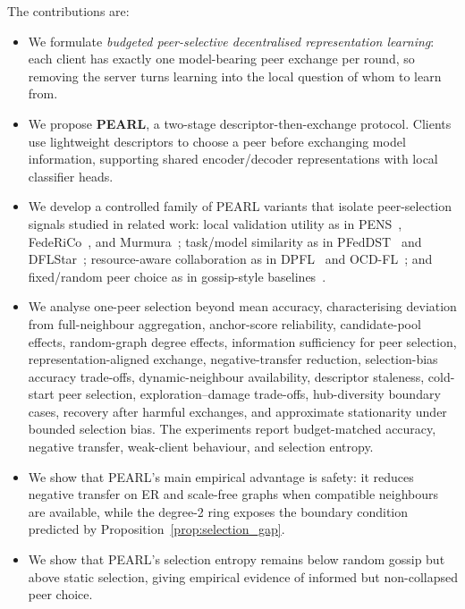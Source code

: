 \documentclass[conference]{IEEEtran}
\begin{document}
The contributions are:
\begin{itemize}
    \item We formulate \emph{budgeted peer-selective decentralised representation learning}: each client has exactly one model-bearing peer exchange per round, so removing the server turns learning into the local question of whom to learn from.

    \item We propose \textbf{PEARL}, a two-stage descriptor-then-exchange protocol. Clients use lightweight descriptors to choose a peer before exchanging model information, supporting shared encoder/decoder representations with local classifier heads.

    \item We develop a controlled family of PEARL variants that isolate peer-selection signals studied in related work: local validation utility as in PENS~\cite{onoszko2021pens}, FedeRiCo~\cite{sui2022federico}, and Murmura~\cite{rangwala2025murmura}; task/model similarity as in PFedDST~\cite{fan2025pfeddst} and DFLStar~\cite{soltani2024dflstar}; resource-aware collaboration as in DPFL~\cite{kharrat2024dpfl} and OCD-FL~\cite{masmoudi2024ocdfl}; and fixed/random peer choice as in gossip-style baselines~\cite{ormandi2013gossip,hegedus2019gossip,koloskova2019choco}.

    \item We analyse one-peer selection beyond mean accuracy, characterising deviation from full-neighbour aggregation, anchor-score reliability, candidate-pool effects, random-graph degree effects, information sufficiency for peer selection, representation-aligned exchange, negative-transfer reduction, selection-bias accuracy trade-offs, dynamic-neighbour availability, descriptor staleness, cold-start peer selection, exploration--damage trade-offs, hub-diversity boundary cases, recovery after harmful exchanges, and approximate stationarity under bounded selection bias. The experiments report budget-matched accuracy, negative transfer, weak-client behaviour, and selection entropy.

    \item We show that \textsc{PEARL}'s main empirical advantage is safety: it reduces negative transfer on ER and scale-free graphs when compatible neighbours are available, while the degree-2 ring exposes the boundary condition predicted by Proposition~\ref{prop:selection_gap}.

    \item We show that \textsc{PEARL}'s selection entropy remains below random gossip but above static selection, giving empirical evidence of informed but non-collapsed peer choice.
\end{itemize}
\end{document}
